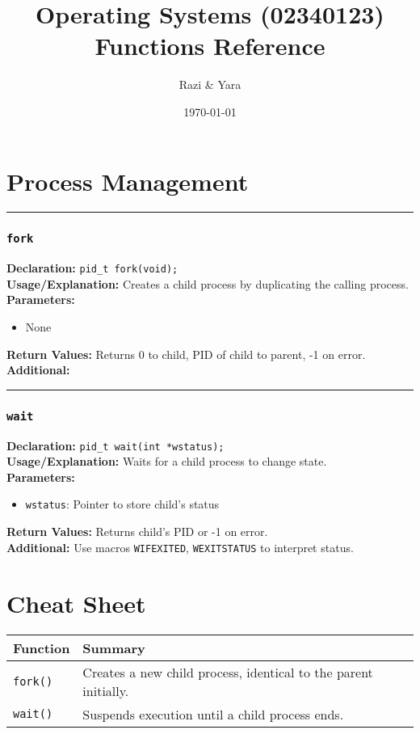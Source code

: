 \documentclass[12pt]{article}
\title{Operating Systems (02340123)\\ Functions Reference}
\author{Razi \& Yara}
\date{\today}
\newcommand{\functionentry}[6]{%
  \noindent\rule{\linewidth}{0.5pt}
  \subsubsection*{\texttt{#1}}
  \textbf{Declaration:} \texttt{#2} \\
  \textbf{Usage/Explanation:} #3 \\
  \textbf{Parameters:}
  \begin{itemize}[leftmargin=*]
    #4
  \end{itemize}
  \textbf{Return Values:} #5 \\
  \textbf{Additional:} #6
  \vspace{1em}
}
\begin{document}
\maketitle
\tableofcontents
\newpage

\section{Process Management}

\functionentry{fork}
{pid\_t fork(void);}
{Creates a child process by duplicating the calling process.}
{\item None}
{Returns 0 to child, PID of child to parent, -1 on error.}
{\label{fork}}

\functionentry{wait}
{pid\_t wait(int *wstatus);}
{Waits for a child process to change state.}
{\item \texttt{wstatus}: Pointer to store child's status}
{Returns child's PID or -1 on error.}
{Use macros \texttt{WIFEXITED}, \texttt{WEXITSTATUS} to interpret status.\label{func:wait}}


\newpage
\section*{Cheat Sheet}
\begin{longtable}{|l|p{11cm}|}
  \hline
  \textbf{Function} & \textbf{Summary}                                                \\
  \hline
  \texttt{fork()}   & Creates a new child process, identical to the parent initially. \\
  \texttt{wait()}   & Suspends execution until a child process ends.                  \\
  \hline
\end{longtable}
\end{document}
